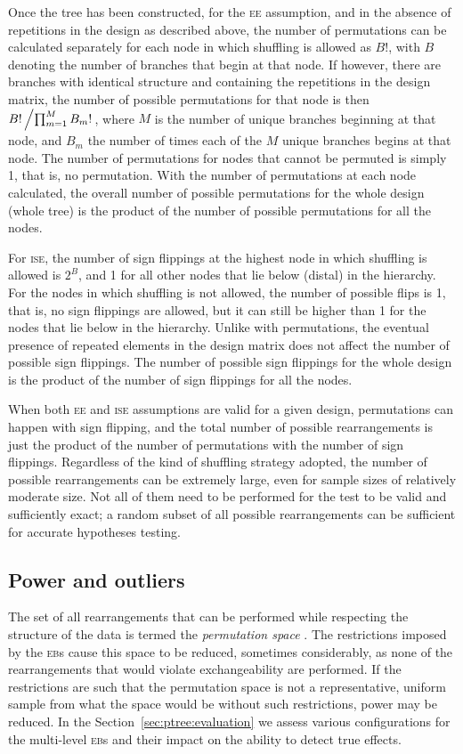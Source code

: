 Once the tree has been constructed, for the \textsc{ee} assumption, and in the absence of repetitions in the design as described above, the number of permutations can be calculated separately for each node in which shuffling is allowed as $B!$, with $B$ denoting the number of branches that begin at that node. If however, there are branches with identical structure and containing the repetitions in the design matrix, the number of possible permutations for that node is then $B!\left/\prod^{M}_{m=1}B_m!\right.$, where $M$ is the number of unique branches beginning at that node, and $B_m$ the number of times each of the $M$ unique branches begins at that node. The number of permutations for nodes that cannot be permuted is simply 1, that is, no permutation. With the number of permutations at each node calculated, the overall number of possible permutations for the whole design (whole tree) is the product of the number of possible permutations for all the nodes.

For \textsc{ise}, the number of sign flippings at the highest node in which shuffling is allowed is $2^B$, and 1 for all other nodes that lie below (distal) in the hierarchy. For the nodes in which shuffling is not allowed, the number of possible flips is 1, that is, no sign flippings are allowed, but it can still be higher than 1 for the nodes that lie below in the hierarchy. Unlike with permutations, the eventual presence of repeated elements in the design matrix does not affect the number of possible sign flippings. The number of possible sign flippings for the whole design is the product of the number of sign flippings for all the nodes.

When both \textsc{ee} and \textsc{ise} assumptions are valid for a given design, permutations can happen with sign flipping, and the total number of possible rearrangements is just the product of the number of permutations with the number of sign flippings. Regardless of the kind of shuffling strategy adopted, the number of possible rearrangements can be extremely large, even for sample sizes of relatively moderate size. Not all of them need to be performed for the test to be valid and sufficiently exact; a random subset of all possible rearrangements can be sufficient for accurate hypotheses testing.

\subsection{Power and outliers}

The set of all rearrangements that can be performed while respecting the structure of the data is termed the \emph{permutation space} \citep{Pesarin2010}. The restrictions imposed by the \textsc{eb}s cause this space to be reduced, sometimes considerably, as none of the rearrangements that would violate exchangeability are performed. If the restrictions are such that the permutation space is not a representative, uniform sample from what the space would be without such restrictions, power may be reduced. In the Section~\ref{sec:ptree:evaluation} we assess various configurations for the multi-level \textsc{eb}s and their impact on the ability to detect true effects.

